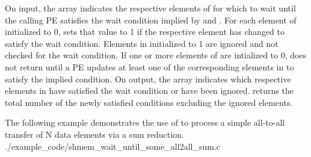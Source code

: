 \begin{apidefinition}
{    On input, the  array indicates the respective elements of
     for which to wait until the calling \ac{PE} satisfies the wait
    condition implied by  and .  For each element of
     initialized to 0,  sets that
    value to 1 if the respective  element has changed to satisfy the
    wait condition. Elements in  initialized to 1 are ignored and
    not checked for the wait condition.  If one or more elements of
     are intialized to 0,  does not
    return until a \ac{PE} updates at least one of the corresponding elements
    in  to satisfy the implied condition.  On output, the
     array indicates which respective elements in  have
    satisfied the wait condition or have been ignored.
     returns the total number of the newly
    satisfied conditions excluding the ignored elements.
}






\begin{apiexamples}

\apicexample
{The following \CorCpp{} example demonstrates the use of 
 to process a simple all-to-all transfer of N data elements via a sum reduction.}
{./example_code/shmem_wait_until_some_all2all_sum.c}
{}

\end{apiexamples}

\end{apidefinition}
